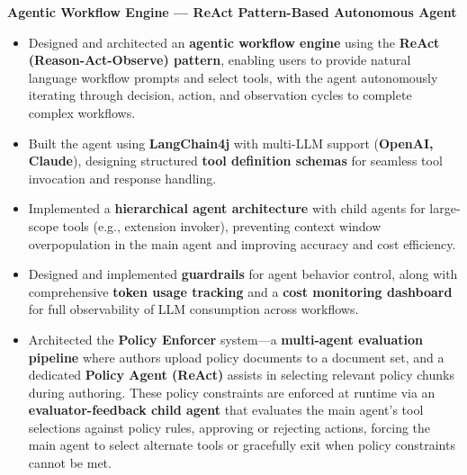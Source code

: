 \documentclass[a4paper,11pt]{article}
\begin{document}
\vspace{4pt}
\textbf{Agentic Workflow Engine --- ReAct Pattern-Based Autonomous Agent}
\begin{itemize}[leftmargin=*, nosep]
  \item Designed and architected an \textbf{agentic workflow engine} using the \textbf{ReAct (Reason-Act-Observe) pattern}, enabling users to provide natural language workflow prompts and select tools, with the agent autonomously iterating through decision, action, and observation cycles to complete complex workflows.
  \item Built the agent using \textbf{LangChain4j} with multi-LLM support (\textbf{OpenAI, Claude}), designing structured \textbf{tool definition schemas} for seamless tool invocation and response handling.
  \item Implemented a \textbf{hierarchical agent architecture} with child agents for large-scope tools (e.g., extension invoker), preventing context window overpopulation in the main agent and improving accuracy and cost efficiency.
  \item Designed and implemented \textbf{guardrails} for agent behavior control, along with comprehensive \textbf{token usage tracking} and a \textbf{cost monitoring dashboard} for full observability of LLM consumption across workflows.
  \item Architected the \textbf{Policy Enforcer} system---a \textbf{multi-agent evaluation pipeline} where authors upload policy documents to a document set, and a dedicated \textbf{Policy Agent (ReAct)} assists in selecting relevant policy chunks during authoring. These policy constraints are enforced at runtime via an \textbf{evaluator-feedback child agent} that evaluates the main agent's tool selections against policy rules, approving or rejecting actions, forcing the main agent to select alternate tools or gracefully exit when policy constraints cannot be met.
\end{itemize}
\end{document}
